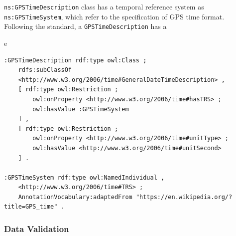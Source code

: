 \texttt{ns:GPSTimeDescription} class has a temporal reference system as \texttt{ns:GPSTimeSystem}, which refer to the specification of GPS time format. Following the standard, a \texttt{GPSTimeDescription} has a 

e\begin{verbatim}
:GPSTimeDescription rdf:type owl:Class ;
    rdfs:subClassOf 
    <http://www.w3.org/2006/time#GeneralDateTimeDescription> ,
    [ rdf:type owl:Restriction ;
        owl:onProperty <http://www.w3.org/2006/time#hasTRS> ;
        owl:hasValue :GPSTimeSystem
    ] ,
    [ rdf:type owl:Restriction ;
        owl:onProperty <http://www.w3.org/2006/time#unitType> ;
        owl:hasValue <http://www.w3.org/2006/time#unitSecond>
    ] .    

:GPSTimeSystem rdf:type owl:NamedIndividual ,
    <http://www.w3.org/2006/time#TRS> ;
    AnnotationVocabulary:adaptedFrom "https://en.wikipedia.org/?title=GPS_time" .
\end{verbatim}


\subsubsection*{Data Validation}

